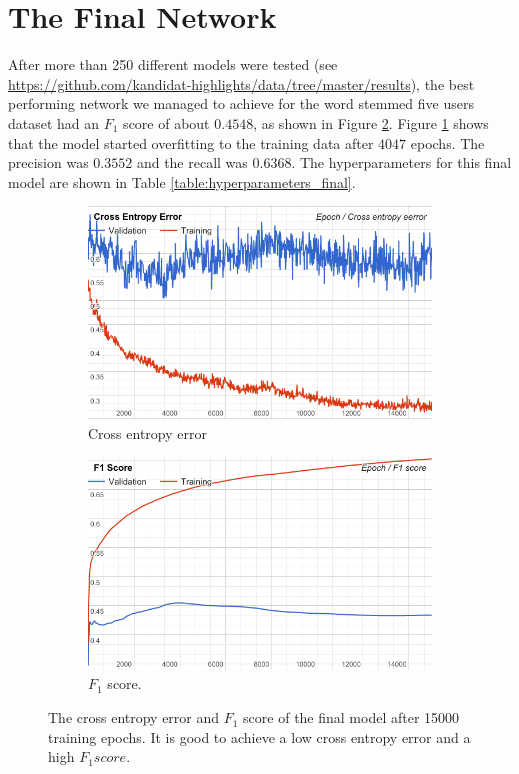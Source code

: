 \section{The Final Network}\label{sec:final_model}
After more than 250 different models were tested (see \url{https://github.com/kandidat-highlights/data/tree/master/results}), the best performing network we managed to achieve for the word stemmed five users dataset had an $F_1$ score of about $0.4548$, as shown in Figure \ref{fig:final_f1}. Figure \ref{fig:final_overfitting} shows that the model started overfitting to the training data after $4047$ epochs. The precision was $0.3552$ and the recall was $0.6368$. The hyperparameters for this final model are shown in Table \ref{table:hyperparameters_final}.
\begin{figure}[h!]
\begin{subfigure}{0.5\textwidth}
\includegraphics[width=1 \linewidth]{figure/results/stemmed_cross}
\caption{Cross entropy error}
\label{fig:final_overfitting}
\end{subfigure}
\begin{subfigure}{0.5\textwidth}
\includegraphics[width=1\linewidth]{figure/results/stemmed_f1}
\caption{$F_1$ score.}
\label{fig:final_f1}
\end{subfigure}
 
\caption{The cross entropy error and $F_1$ score of the final model after 15000 training epochs. It is good to achieve a low cross entropy error and a high $F_1 score$.}
\label{fig:final_stemmed}
\end{figure}
